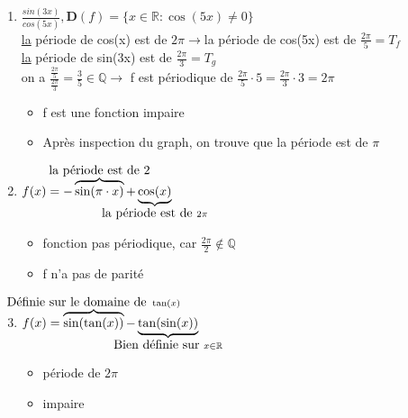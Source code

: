 \documentclass[12pt,a4paper]{article}
\newcommand{\R}{\ensuremath{\mathbb{R}} }
\begin{document}
{\begin{enumerate}
\item $\frac{sin(3x)}{cos(5x)}, \mathbf{D}(f)=\{x \in \R : \cos(5x) \neq 0\} $\\
	\underline{la} période de cos(x) est de $2\pi \to $la période de cos(5x) est de $\frac{2\pi}{5} = T_f$\\
		\underline{la} période de sin(3x) est de $\frac{2\pi}{3} = T_g$\\
		on a $\frac{\frac{2\pi}{5}}{\frac{2\pi}{3}} = \frac{3}{5} \in \mathbb{Q} \to$ f est périodique de $\frac{2\pi}{5}\cdot 5 = \frac{2\pi}{3} \cdot 3 = 2\pi$
		\begin{itemize}
			\item f est une fonction impaire
			\item Après inspection du graph, on trouve que la période est de $\pi$
		\end{itemize}
		
	\item $f(x) = -\overbrace{\sin(\pi \cdot x)}^{\mathclap{\mbox{la période est de 2}}}+\underbrace{\cos(x)}_{\mathclap{\mbox{la période est de }2\pi}}$
		\begin{itemize}
			\item fonction pas périodique, car $\frac{2\pi}{2} \not \in \mathbb{Q}$
			\item f n'a pas de parité
		\end{itemize}
	\item $f(x) = \overbrace{\sin(\tan(x))}^{\mathclap{\mbox{Définie sur le domaine de } \tan(x)}}-\underbrace{\tan(\sin(x))}_{\mathclap{\mbox{Bien définie sur }x\in \R}}$
		\begin{itemize}
			\item période de $2\pi$
			\item impaire
		\end{itemize}
\end{enumerate}

}
\end{document}
